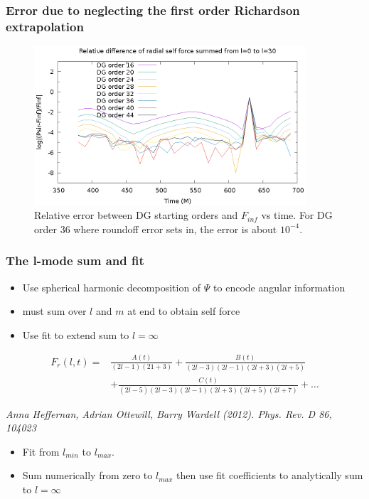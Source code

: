 \documentclass{beamer}
\begin{document}
\begin{frame}
  \frametitle{Error due to neglecting the first order Richardson extrapolation}
  \begin{figure}
    \includegraphics[width=0.9\textwidth]{reldiffpsirvtwfinfdgorders2}
    \caption{Relative error between DG starting orders and $F_{inf}$ vs time. For DG order 36 where roundoff error sets in, the error is about $10^{-4}$.}
  \end{figure}
\end{frame}

\begin{frame}
  \frametitle{The l-mode sum and fit}
  \begin{itemize}
  \item Use spherical harmonic decomposition of $\Psi$ to encode angular information
  \item must sum over $l$ and $m$ at end to obtain self force
  \item Use fit to extend sum to $l=\infty$
  \end{itemize}
  
  \begin{eqnarray}
    F_r(l,t)=&\frac{A(t)}{(2l-1)(21+3)}+\frac{B(t)}{(2l-3)(2l-1)(2l+3)(2l+5)}\nonumber \\
    &+\frac{C(t)}{(2l-5)(2l-3)(2l-1)(2l+3)(2l+5)(2l+7)}+\ldots
  \end{eqnarray}

   {\em Anna Heffernan, Adrian Ottewill, Barry Wardell (2012). Phys. Rev. D 86, 104023}

  \begin{itemize}
  \item Fit from $l_{min}$ to $l_{max}$.
  \item Sum numerically from zero to $l_{max}$ then use fit coefficients to analytically sum to $l=\infty$

  \end{itemize}
\end{frame}
\end{document}
